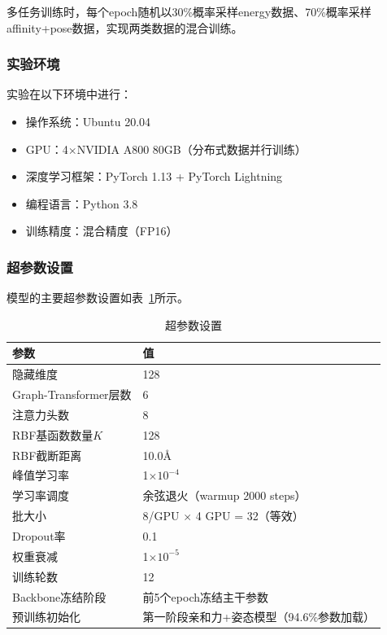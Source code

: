 多任务训练时，每个epoch随机以30\%概率采样energy数据、70\%概率采样affinity+pose数据，实现两类数据的混合训练。

\subsubsection{实验环境}

实验在以下环境中进行：

\begin{itemize}
    \item 操作系统：Ubuntu 20.04
    \item GPU：4$\times$NVIDIA A800 80GB（分布式数据并行训练）
    \item 深度学习框架：PyTorch 1.13 + PyTorch Lightning
    \item 编程语言：Python 3.8
    \item 训练精度：混合精度（FP16）
\end{itemize}

\subsubsection{超参数设置}

模型的主要超参数设置如表~\ref{T.hyperparameters}所示。

\begin{table}[htb]
  \centering
  \caption{超参数设置}
  \label{T.hyperparameters}
  \begin{tabular}{ll}
  \hline
  参数 & 值 \\
  \hline
  隐藏维度 & 128 \\
  Graph-Transformer层数 & 6 \\
  注意力头数 & 8 \\
  RBF基函数数量$K$ & 128 \\
  RBF截断距离 & 10.0\AA \\
  峰值学习率 & 1$\times 10^{-4}$ \\
  学习率调度 & 余弦退火（warmup 2000 steps） \\
  批大小 & 8/GPU $\times$ 4 GPU = 32（等效） \\
  Dropout率 & 0.1 \\
  权重衰减 & 1$\times 10^{-5}$ \\
  训练轮数 & 12 \\
  Backbone冻结阶段 & 前5个epoch冻结主干参数 \\
  预训练初始化 & 第一阶段亲和力+姿态模型（94.6\%参数加载） \\
  \hline
\end{tabular}
\end{table}

